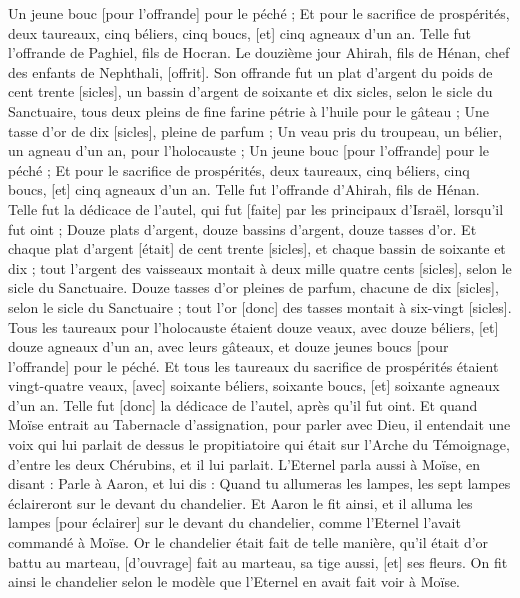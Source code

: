 \begin{multicols}{2}
Un jeune bouc [pour l'offrande] pour le péché ;
Et pour le sacrifice de prospérités, deux taureaux, cinq béliers, cinq boucs, [et] cinq agneaux d'un an. Telle fut l'offrande de Paghiel, fils de Hocran.
Le douzième jour Ahirah, fils de Hénan, chef des enfants de Nephthali, [offrit].
Son offrande fut un plat d'argent du poids de cent trente [sicles], un bassin d'argent de soixante et dix sicles, selon le sicle du Sanctuaire, tous deux pleins de fine farine pétrie à l'huile pour le gâteau ;
Une tasse d'or de dix [sicles], pleine de parfum ;
Un veau pris du troupeau, un bélier, un agneau d'un an, pour l'holocauste ;
Un jeune bouc [pour l'offrande] pour le péché ;
Et pour le sacrifice de prospérités, deux taureaux, cinq béliers, cinq boucs, [et] cinq agneaux d'un an. Telle fut l'offrande d'Ahirah, fils de Hénan.
Telle fut la dédicace de l'autel, qui fut [faite] par les principaux d'Israël, lorsqu'il fut oint ; Douze plats d'argent, douze bassins d'argent, douze tasses d'or.
Et chaque plat d'argent [était] de cent trente [sicles], et chaque bassin de soixante et dix ; tout l'argent des vaisseaux montait à deux mille quatre cents [sicles], selon le sicle du Sanctuaire.
Douze tasses d'or pleines de parfum, chacune de dix [sicles], selon le sicle du Sanctuaire ; tout l'or [donc] des tasses montait à six-vingt [sicles].
Tous les taureaux pour l'holocauste étaient douze veaux, avec douze béliers, [et] douze agneaux d'un an, avec leurs gâteaux, et douze jeunes boucs [pour l'offrande] pour le péché.
Et tous les taureaux du sacrifice de prospérités étaient vingt-quatre veaux, [avec] soixante béliers, soixante boucs, [et] soixante agneaux d'un an. Telle fut [donc] la dédicace de l'autel, après qu'il fut oint.
Et quand Moïse entrait au Tabernacle d'assignation, pour parler avec Dieu, il entendait une voix qui lui parlait de dessus le propitiatoire qui était sur l'Arche du Témoignage, d'entre les deux Chérubins, et il lui parlait.
\VerseOne{}L'Eternel parla aussi à Moïse, en disant :
Parle à Aaron, et lui dis : Quand tu allumeras les lampes, les sept lampes éclaireront sur le devant du chandelier.
Et Aaron le fit ainsi, et il alluma les lampes [pour éclairer] sur le devant du chandelier, comme l'Eternel l'avait commandé à Moïse.
Or le chandelier était fait de telle manière, qu'il était d'or battu au marteau, [d'ouvrage] fait au marteau, sa tige aussi, [et] ses fleurs. On fit ainsi le chandelier selon le modèle que l'Eternel en avait fait voir à Moïse.

\end{multicols}
